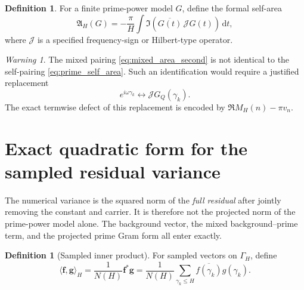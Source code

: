 \documentclass[11pt]{amsart}
\numberwithin{equation}{section}
\theoremstyle{plain}
\theoremstyle{definition}
\newtheorem{definition}[theorem]{Definition}
\theoremstyle{remark}
\newtheorem{warning}[theorem]{Warning}
\newcommand{\1}{\mathbf{1}}
\newcommand{\dd}{\,\mathrm{d}}
\newcommand{\cJ}{\mathcal J}
\begin{document}
\begin{definition}
\label{def:prime_self_area}
For a finite prime-power model \(G\), define the formal self-area
\begin{equation}
\mathfrak A_H(G)
=
-\frac{\pi}{H}
\int
\Im\left(
\overline{G(t)}\,\cJ G(t)
\right)\dd t,
\label{eq:prime_self_area}
\end{equation}
where \(\cJ\) is a specified frequency-sign or Hilbert-type operator.
\end{definition}

\begin{warning}
\label{warn:mixed_not_self}
The mixed pairing \eqref{eq:mixed_area_second} is not identical to the
self-pairing \eqref{eq:prime_self_area}.  Such an identification would
require a justified replacement
\begin{equation}
e^{i\omega\gamma_k}
\longleftrightarrow
\cJ G_Q(\gamma_k).
\label{eq:unproved_operator_replacement}
\end{equation}
The exact termwise defect of this replacement is encoded by
\(\Re M_H(n)-\pi v_n\).
\end{warning}

\section{Exact quadratic form for the sampled residual variance}
\label{sec:exact_variance_form}

The numerical variance is the squared norm of the \emph{full residual}
after jointly removing the constant and carrier.  It is therefore not the
projected norm of the prime-power model alone.  The background vector, the
mixed background--prime term, and the projected prime Gram form all enter
exactly.

\begin{definition}[Sampled inner product]
\label{def:sample_inner_product}
For sampled vectors on $\Gamma_H$, define
\begin{equation}
\langle \mathbf f,\mathbf g\rangle_H
=
\frac1{N(H)}\mathbf f^\ast\mathbf g
=
\frac1{N(H)}\sum_{\gamma_k\leq H}
\overline{f(\gamma_k)}g(\gamma_k).
\label{eq:sample_inner_product}
\end{equation}
\end{definition}
\end{document}
